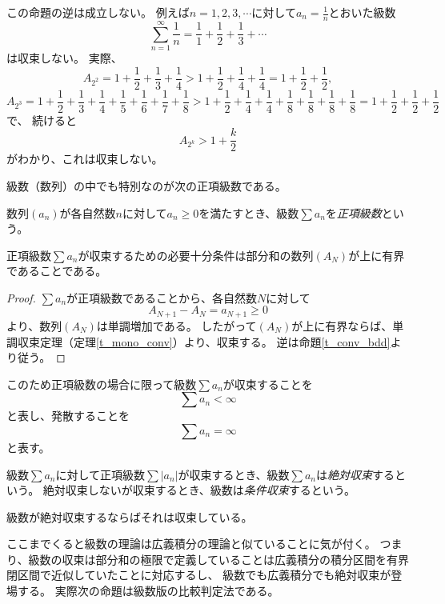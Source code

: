 \begin{remark}
\label{t_harm_ser}
この命題の逆は成立しない。
例えば$n = 1, 2, 3, \cdots$に対して$a_n = \frac{1}{n}$とおいた級数
$$
\sum_{n = 1}^\infty \frac{1}{n} = \frac{1}{1}+\frac{1}{2}+\frac{1}{3}+\cdots
$$
は収束しない。
実際、
$$
A_{2^2} = 1+\frac{1}{2}+\frac{1}{3}+\frac{1}{4} > 1+\frac{1}{2}+\frac{1}{4}+\frac{1}{4} = 1+\frac{1}{2}+\frac{1}{2},
$$
$$
A_{2^3} = 1+\frac{1}{2}+\frac{1}{3}+\frac{1}{4}+\frac{1}{5}+\frac{1}{6}+\frac{1}{7}+\frac{1}{8} > 1+\frac{1}{2}+\frac{1}{4}+\frac{1}{4}+\frac{1}{8}+\frac{1}{8}+\frac{1}{8}+\frac{1}{8} = 1+\frac{1}{2}+\frac{1}{2}+\frac{1}{2}
$$
で、
続けると
$$
A_{2^k} > 1+\frac{k}{2}
$$
がわかり、これは収束しない。
\end{remark}

級数（数列）の中でも特別なのが次の正項級数である。

\begin{definition}[正項級数]
数列$(a_n)$が各自然数$n$に対して$a_n \ge 0$を満たすとき、級数$\sum a_n$を\emph{正項級数}という。
\end{definition}

\begin{proposition}
正項級数$\sum a_n$が収束するための必要十分条件は部分和の数列$(A_N)$が上に有界であることである。
\end{proposition}

\begin{proof}
$\sum a_n$が正項級数であることから、各自然数$N$に対して
$$
A_{N+1}-A_N = a_{N+1} \ge 0
$$
より、数列$(A_N)$は単調増加である。
したがって$(A_N)$が上に有界ならば、単調収束定理（定理\ref{t_mono_conv}）より、収束する。
逆は命題\ref{t_conv_bdd}より従う。
\end{proof}

このため正項級数の場合に限って級数$\sum a_n$が収束することを
$$
\sum a_n < \infty
$$
と表し、発散することを
$$
\sum a_n = \infty
$$
と表す。

\begin{definition}[級数の絶対収束と条件収束]
級数$\sum a_n$に対して正項級数$\sum |a_n|$が収束するとき、級数$\sum a_n$は\emph{絶対収束}するという。
絶対収束しないが収束するとき、級数は\emph{条件収束}するという。
\end{definition}

\begin{remark}
級数が絶対収束するならばそれは収束している。
\end{remark}

ここまでくると級数の理論は広義積分の理論と似ていることに気が付く。
つまり、級数の収束は部分和の極限で定義していることは広義積分の積分区間を有界閉区間で近似していたことに対応するし、
級数でも広義積分でも絶対収束が登場する。
実際次の命題は級数版の比較判定法である。

